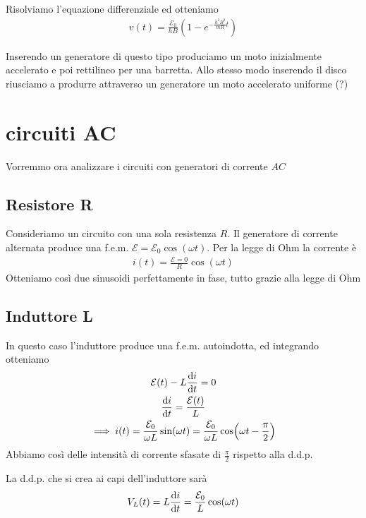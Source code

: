 Risolviamo l'equazione differenziale ed otteniamo
\begin{gather*}
	v(t)=\frac{\mathcal{E}_0}{hB}\left( 1-e^{-\frac{h^2B^2}{mR}t} \right)
\end{gather*}

Inserendo un generatore di questo tipo produciamo un moto inizialmente accelerato e poi rettilineo per una barretta. 
Allo stesso modo inserendo il disco riusciamo a produrre attraverso un generatore un moto accelerato uniforme (?)




\section{circuiti AC}
Vorremmo ora analizzare i circuiti con generatori di corrente $AC $
\subsection{Resistore R}
Consideriamo un circuito con una sola resistenza $R$. Il generatore di corrente alternata produce una f.e.m. $\mathcal{E}=\mathcal{E}_0\cos(\omega t)$. Per la legge di Ohm la corrente è
\begin{gather*}
	i(t)=\frac{\mathcal{E}=0}{R}\cos(\omega t)
\end{gather*}
Otteniamo così due sinusoidi perfettamente in fase, tutto grazie alla legge di Ohm

\subsection{Induttore L}
In questo caso l'induttore produce una f.e.m. autoindotta, ed integrando otteniamo
\begin{gather*}
	\mathcal{E}(t)-L\dv{i}{t}=0\\
	\dv{i}{t}=\frac{\mathcal{E}(t)}{L}\\
	\implies i(t)=\frac{\mathcal{E}_0}{\omega L}\sin(\omega t)=\frac{\mathcal{E}_0}{\omega L}\cos(\omega t-\frac{\pi}{2})
\end{gather*}
Abbiamo così delle intensità di corrente sfasate di $\frac{\pi}{2}$ rispetto alla d.d.p.

La d.d.p. che si crea ai capi dell'induttore sarà
\begin{gather*}
	V_L(t)=L\dv{i}{t}=\frac{\mathcal{E}_0}{L}\cos(\omega t)
\end{gather*}


